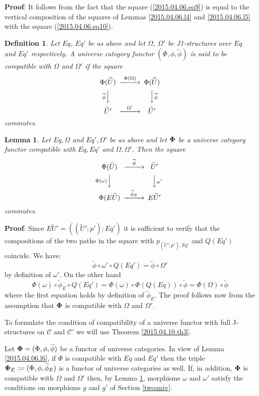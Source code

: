 \documentclass[12pt]{article}
\newenvironment{myproof}{{\bf Proof}:}{\vskip 5mm }
\newtheorem{lemma}[proposition]{Lemma}
\newtheorem{definition}[proposition]{Definition}
\newcommand{\llabel}[1]{\label{#1}}
\newcommand{\wt}{\widetilde}
\begin{document}
%
\begin{myproof}
It follows from the fact that the square (\ref{2015.04.06.eq9}) is equal to the vertical composition of the 
squares of Lemmas \ref{2015.04.06.l4} and \ref{2015.04.06.l5} with the square (\ref{2015.04.06.eq10}).
\end{myproof}
%


\begin{definition}
\llabel{2015.04.06.def5}
Let $Eq$, $Eq'$ be as above and let $\Omega$, $\Omega'$ be J1-structures over $Eq$ and $Eq'$ respectively. A universe category functor $(\Phi,\phi,\wt{\phi})$ is said to be compatible with $\Omega$ and $\Omega'$ if the square
%
$$
\begin{CD}
\Phi(\wt{U}) @>\Phi(\Omega)>> \Phi(\wt{U})\\
@V\wt{\phi} VV @VV\wt{\phi} V\\
\wt{U}' @>\Omega'>> \wt{U}'
\end{CD}
$$
%
commutes.
\end{definition}
%
\begin{lemma}
\llabel{2015.04.10.l7}
Let $Eq,\Omega$ and $Eq',\Omega'$ be as above and let ${\bf\Phi}$ be a universe category functor compatible with $Eq,Eq'$ and $\Omega,\Omega'$. Then the square
%
$$
\begin{CD}
\Phi(\wt{U}) @>\wt{\phi}>> \wt{U}'\\
@V\Phi(\omega)VV @VV\omega' V\\
\Phi(E\wt{U}) @>\wt{\phi}_{E}>> E\wt{U}'
\end{CD}
$$
%
commutes.
\end{lemma}
%
\begin{myproof}
Since $E\wt{U}'=((\wt{U}';p');Eq')$ it is sufficient to verify that the compositions of the two paths in the square with $p_{(\wt{U}';p'),Eq'}$ and $Q(Eq')$ coincide. We have:
%
$$\wt{\phi}\circ\omega'\circ Q(Eq')=\wt{\phi}\circ\Omega'$$
%
by definition of $\omega'$. On the other hand
%
$$\Phi(\omega)\circ \wt{\phi}_{E}\circ Q(Eq')=\Phi(\omega)\circ \Phi(Q(Eq))\circ \wt{\phi}=\Phi(\Omega)\circ\wt{\phi}$$
%
where the first equation holds by definition of $\wt{\phi}_{E}$. The proof follows now from the assumption that ${\bf\Phi}$ is compatible with $\Omega$ and $\Omega'$. 
\end{myproof}
%


To formulate the condition of compatibility of a universe functor with full J-structures on $\mathcal C$ and $\mathcal C'$ we will use Theorem \ref{2015.04.10.th3}.

Let ${\bf\Phi}=(\Phi,\phi,\wt{\phi})$ be a functor of universe categories. In view of Lemma \ref{2015.04.06.l6}, if $\Phi$ is compatible with $Eq$ and $Eq'$ then the triple ${\bf\Phi}_{E}:=(\Phi,\phi,\wt{\phi}_{E})$ is a functor of universe categories as well. If, in addition, ${\bf\Phi}$ is compatible with $\Omega$ and $\Omega'$ then, by Lemma \ref{2015.04.10.l7}, morphisms $\omega$ and $\omega'$ satisfy the conditions on morphisms $g$ and $g'$ of Section \ref{twouniv}. 
\end{document}

